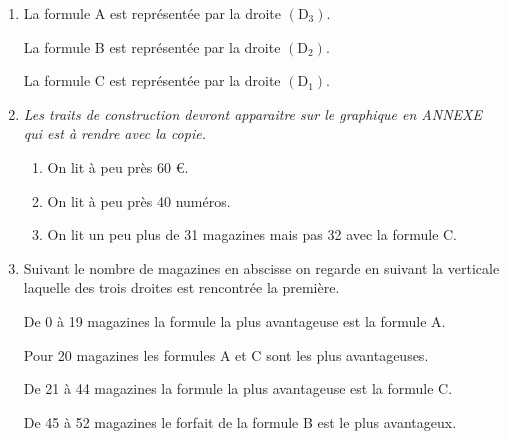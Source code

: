 \begin{enumerate}
\item %
%
La formule A est représentée par la droite $\left(\text{D}_3\right)$.

La formule B est représentée par la droite $\left(\text{D}_2\right)$.

La formule C est représentée par la droite $\left(\text{D}_1\right)$.
\item  %

\emph{Les traits de construction devront apparaitre sur le graphique en ANNEXE qui est à rendre avec la copie.}
	\begin{enumerate}
		\item %
On lit à peu près 60 \euro.
		\item %
On lit à peu près 40 numéros.
		\item %
		On lit un peu plus de 31 magazines mais pas 32 avec la formule C.
	\end{enumerate}
\item  %
Suivant le nombre de magazines en abscisse on regarde en suivant la verticale laquelle des trois droites est rencontrée la première.

De 0 à 19 magazines la formule la plus avantageuse est la formule A.

Pour 20 magazines les formules A et C sont les plus avantageuses.

De 21 à 44 magazines la formule la plus avantageuse est la formule C.

De 45 à 52 magazines le forfait de la formule B est le plus avantageux.
\end{enumerate}


